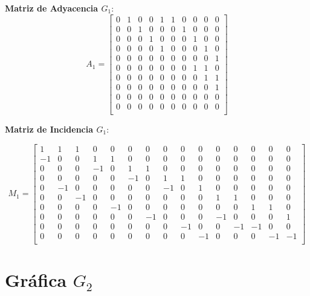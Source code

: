 \documentclass{article}
\begin{document}
\textbf{Matriz de Adyacencia \( G_1 \)}:
\[
	A_1 =
	\begin{bmatrix}
		0 & 1 & 0 & 0 & 1 & 1 & 0 & 0 & 0 & 0 \\
		0 & 0 & 1 & 0 & 0 & 0 & 1 & 0 & 0 & 0 \\
		0 & 0 & 0 & 1 & 0 & 0 & 0 & 1 & 0 & 0 \\
		0 & 0 & 0 & 0 & 1 & 0 & 0 & 0 & 1 & 0 \\
		0 & 0 & 0 & 0 & 0 & 0 & 0 & 0 & 0 & 1 \\
		0 & 0 & 0 & 0 & 0 & 0 & 0 & 1 & 1 & 0 \\
		0 & 0 & 0 & 0 & 0 & 0 & 0 & 0 & 1 & 1 \\
		0 & 0 & 0 & 0 & 0 & 0 & 0 & 0 & 0 & 1 \\
		0 & 0 & 0 & 0 & 0 & 0 & 0 & 0 & 0 & 0 \\
		0 & 0 & 0 & 0 & 0 & 0 & 0 & 0 & 0 & 0 \\
	\end{bmatrix}
\]


\textbf{Matriz de Incidencia \( G_1 \)}:

\setcounter{MaxMatrixCols}{20}
\[
	M_1 =
	\begin{bmatrix}
		1  & 1  & 1  & 0  & 0  & 0  & 0  & 0  & 0  & 0  & 0  & 0  & 0  & 0  & 0  \\
		-1 & 0  & 0  & 1  & 1  & 0  & 0  & 0  & 0  & 0  & 0  & 0  & 0  & 0  & 0  \\
		0  & 0  & 0  & -1 & 0  & 1  & 1  & 0  & 0  & 0  & 0  & 0  & 0  & 0  & 0  \\
		0  & 0  & 0  & 0  & 0  & -1 & 0  & 1  & 1  & 0  & 0  & 0  & 0  & 0  & 0  \\
		0  & -1 & 0  & 0  & 0  & 0  & 0  & -1 & 0  & 1  & 0  & 0  & 0  & 0  & 0  \\
		0  & 0  & -1 & 0  & 0  & 0  & 0  & 0  & 0  & 0  & 1  & 1  & 0  & 0  & 0  \\
		0  & 0  & 0  & 0  & -1 & 0  & 0  & 0  & 0  & 0  & 0  & 0  & 1  & 1  & 0  \\
		0  & 0  & 0  & 0  & 0  & 0  & -1 & 0  & 0  & 0  & -1 & 0  & 0  & 0  & 1  \\
		0  & 0  & 0  & 0  & 0  & 0  & 0  & 0  & -1 & 0  & 0  & -1 & -1 & 0  & 0  \\
		0  & 0  & 0  & 0  & 0  & 0  & 0  & 0  & 0  & -1 & 0  & 0  & 0  & -1 & -1 \\
	\end{bmatrix}
\]

\section*{Gráfica \( G_2 \)}
\end{document}
